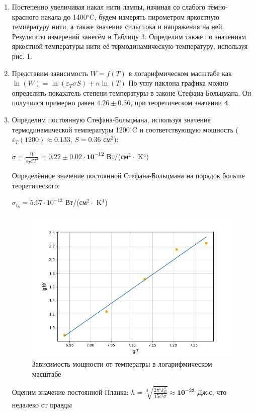 \documentclass[a4paper, 12pt]{article}
\begin{document}
\begin{enumerate}
    \item Постепенно увеличивая накал нити лампы, начиная со слабого тёмно-красного накала до 1400$^{\circ}$C, будем измерять пирометром яркостную температуру нити, а также значение силы тока и напряжения на ней. Результаты измерений занесём в Таблицу 3. Определим также по значениям яркостной температуры нити её термодинамическую температуру, используя рис. 1.

    \item Представим зависимость $W=f(T)$ в логарифмическом масштабе как $\ln(W) = \ln(\varepsilon_T \sigma S) + n \ln(T)$ По углу наклона графика можно определить показатель степени температуры в законе Стефана-Больцмана. Он получился примерно равен $\pmb{4.26\pm0.36}$, при теоретическом значении $\pmb{4}$.

    \item Определим постоянную Стефана-Больцмана, используя значение термодинамической температуры 1200$^{\circ}$C и соответствующую мощность ($\varepsilon_T(1200) \approx 0.133$, $S = 0.36$ см$^2$):
    
    \begin{center}
        $\sigma = \frac{W}{\varepsilon_T S T^4} = \pmb{0.22\pm0.02 \cdot 10^{\pmb{-12}}}$ Вт/(см$^2 \cdot$ K$^4$)
    \end{center}

    Определённое значение постоянной Стефана-Больцмана на порядок больше теоретического:
    
    \begin{center}
        $\sigma_t_h = 5.67\cdot 10^{-12}$ Вт/(см$^2 \cdot$ K$^4$)
    \end{center}

    \begin{figure}[h]
        \includegraphics[scale=0.9]{images/1.png}
        \caption{Зависимость мощности от температры в логарифмическом масштабе}
        \label{graf_g}
    \end{figure} 

    Оценим значение постоянной Планка:
        $h = \sqrt[3]{\frac{2 \pi^5 k_B^4}{15 c^2 \sigma}} \approx \pmb{10}^{\pmb{-33}}$ Дж$\cdot$с, что недалеко от правды

\end{enumerate}
\end{document}
